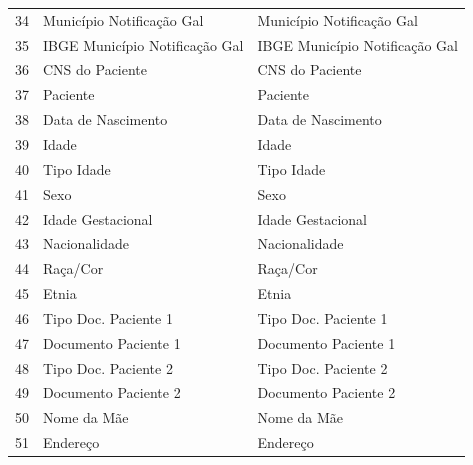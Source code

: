 \begin{table}
\begin{tabular}{lll}
34                                   & Município Notificação Gal        & Município Notificação Gal         \\
35                                   & IBGE Município Notificação Gal   & IBGE Município Notificação Gal    \\
36                                   & CNS do Paciente                  & CNS do Paciente                   \\
\rowcolor[rgb]{0.753,0.753,0.753} 37 & Paciente                         & Paciente                          \\
\rowcolor[rgb]{0.753,0.753,0.753} 38 & Data de Nascimento               & Data de Nascimento                \\
39                                   & Idade                            & Idade                             \\
40                                   & Tipo Idade                       & Tipo Idade                        \\
\rowcolor[rgb]{0.753,0.753,0.753} 41 & Sexo                             & Sexo                              \\
42                                   & Idade Gestacional                & Idade Gestacional                 \\
43                                   & Nacionalidade                    & Nacionalidade                     \\
44                                   & Raça/Cor                         & Raça/Cor                          \\
45                                   & Etnia                            & Etnia                             \\
46                                   & Tipo Doc. Paciente 1             & Tipo Doc. Paciente 1              \\
47                                   & Documento Paciente 1             & Documento Paciente 1              \\
48                                   & Tipo Doc. Paciente 2             & Tipo Doc. Paciente 2              \\
49                                   & Documento Paciente 2             & Documento Paciente 2              \\
50                                   & Nome da Mãe                      & Nome da Mãe                       \\
51                                   & Endereço                         & Endereço                          \\

\end{tabular}
\end{table}
